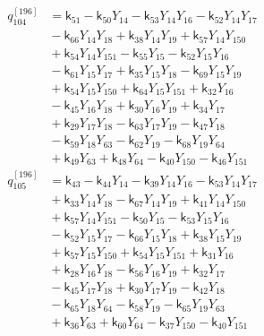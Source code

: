 \begin{equation}\label{q196:row:104}
\begin{aligned}
q_{104}^{[196]} &={} \mathsf{k}_{51} - \mathsf{k}_{50}Y_{14} - \mathsf{k}_{53}Y_{14}Y_{16} - \mathsf{k}_{52}Y_{14}Y_{17}\\
&{} - \mathsf{k}_{66}Y_{14}Y_{18} + \mathsf{k}_{38}Y_{14}Y_{19} + \mathsf{k}_{57}Y_{14}Y_{150}\\
&{} + \mathsf{k}_{54}Y_{14}Y_{151} - \mathsf{k}_{55}Y_{15} - \mathsf{k}_{52}Y_{15}Y_{16}\\
&{} - \mathsf{k}_{61}Y_{15}Y_{17} + \mathsf{k}_{35}Y_{15}Y_{18} - \mathsf{k}_{69}Y_{15}Y_{19}\\
&{} + \mathsf{k}_{54}Y_{15}Y_{150} + \mathsf{k}_{64}Y_{15}Y_{151} + \mathsf{k}_{32}Y_{16}\\
&{} - \mathsf{k}_{45}Y_{16}Y_{18} + \mathsf{k}_{30}Y_{16}Y_{19} + \mathsf{k}_{34}Y_{17}\\
&{} + \mathsf{k}_{29}Y_{17}Y_{18} - \mathsf{k}_{63}Y_{17}Y_{19} - \mathsf{k}_{47}Y_{18}\\
&{} - \mathsf{k}_{59}Y_{18}Y_{63} - \mathsf{k}_{62}Y_{19} - \mathsf{k}_{68}Y_{19}Y_{64}\\
&{} + \mathsf{k}_{49}Y_{63} + \mathsf{k}_{48}Y_{64} - \mathsf{k}_{40}Y_{150} - \mathsf{k}_{46}Y_{151}
\end{aligned}
\end{equation}
\begin{equation}\label{q196:row:105}
\begin{aligned}
q_{105}^{[196]} &={} \mathsf{k}_{43} - \mathsf{k}_{44}Y_{14} - \mathsf{k}_{39}Y_{14}Y_{16} - \mathsf{k}_{53}Y_{14}Y_{17}\\
&{} + \mathsf{k}_{33}Y_{14}Y_{18} - \mathsf{k}_{67}Y_{14}Y_{19} + \mathsf{k}_{41}Y_{14}Y_{150}\\
&{} + \mathsf{k}_{57}Y_{14}Y_{151} - \mathsf{k}_{50}Y_{15} - \mathsf{k}_{53}Y_{15}Y_{16}\\
&{} - \mathsf{k}_{52}Y_{15}Y_{17} - \mathsf{k}_{66}Y_{15}Y_{18} + \mathsf{k}_{38}Y_{15}Y_{19}\\
&{} + \mathsf{k}_{57}Y_{15}Y_{150} + \mathsf{k}_{54}Y_{15}Y_{151} + \mathsf{k}_{31}Y_{16}\\
&{} + \mathsf{k}_{28}Y_{16}Y_{18} - \mathsf{k}_{56}Y_{16}Y_{19} + \mathsf{k}_{32}Y_{17}\\
&{} - \mathsf{k}_{45}Y_{17}Y_{18} + \mathsf{k}_{30}Y_{17}Y_{19} - \mathsf{k}_{42}Y_{18}\\
&{} - \mathsf{k}_{65}Y_{18}Y_{64} - \mathsf{k}_{58}Y_{19} - \mathsf{k}_{65}Y_{19}Y_{63}\\
&{} + \mathsf{k}_{36}Y_{63} + \mathsf{k}_{60}Y_{64} - \mathsf{k}_{37}Y_{150} - \mathsf{k}_{40}Y_{151}
\end{aligned}
\end{equation}
